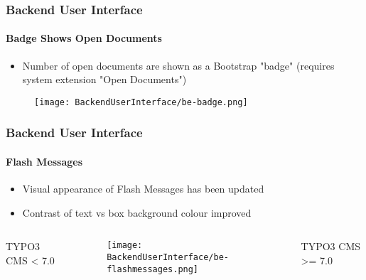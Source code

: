\begin{frame}[fragile]
	\frametitle{Backend User Interface}
	\framesubtitle{Badge Shows Open Documents}

	\begin{itemize}
		\item Number of open documents are shown as a Bootstrap "badge"\newline
			(requires system extension "Open Documents")
	\end{itemize}
	\begin{figure}
		\texttt{[image: BackendUserInterface/be-badge.png]}
	\end{figure}

\end{frame}


\begin{frame}[fragile]
	\frametitle{Backend User Interface}
	\framesubtitle{Flash Messages}

	\begin{itemize}
		\item Visual appearance of Flash Messages has been updated 
		\item Contrast of text vs box background colour improved
	\end{itemize}

	\begin{columns}[T]
		\begin{column}{.25\textwidth}
			\smaller\hfill 
				\begingroup\color{typo3red}TYPO3 CMS < 7.0\endgroup
			\normalsize
		\end{column}

		\begin{column}{.5\textwidth}
			\begin{figure}\vspace*{-0.6cm}
				\texttt{[image: BackendUserInterface/be-flashmessages.png]}
			\end{figure}
		\end{column}

		\begin{column}{.25\textwidth}
			\smaller
				\begingroup\color{typo3red}TYPO3 CMS >= 7.0\endgroup
			\normalsize
		\end{column}
	\end{columns}

\end{frame}

